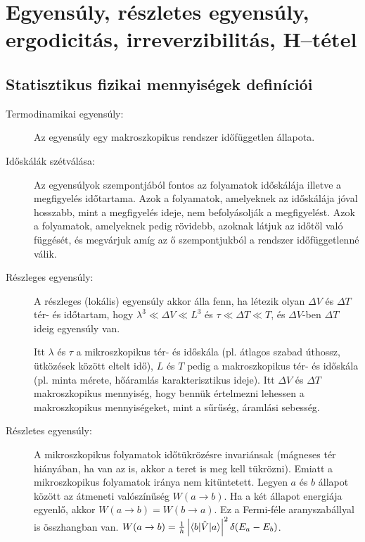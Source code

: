 \chapter{Egyens\'uly, r\'eszletes egyens\'uly, ergodicit\'as, irreverzibilit\'as, H--t\'etel}\label{B1tetel}
 
 \section{Statisztikus fizikai mennyiségek definíciói}
  
  \begin{description}
   \item[Termodinamikai egyensúly:]
    
    Az egyensúly egy makroszkopikus rendszer időfüggetlen állapota. 
   
   \item[Időskálák szétválása:]
    
    Az egyensúlyok szempontjából fontos az folyamatok időskálája illetve a megfigyelés időtartama. Azok a folyamatok, amelyeknek az időskálája jóval hosszabb, mint a megfigyelés ideje, nem befolyásolják a megfigyelést. Azok a folyamatok, amelyeknek pedig rövidebb, azoknak látjuk az időtől való függését, és megvárjuk amíg az ő szempontjukból a rendszer időfüggetlenné válik. 
   
   \item[Részleges egyensúly:]
    
    A részleges (lokális) egyensúly akkor álla fenn, ha létezik olyan $\Delta V$ és $\Delta T$ tér- és időtartam, hogy $\lambda^3\ll\Delta V\ll L^3$ és $\tau\ll \Delta T\ll T$, és $\Delta V$-ben $\Delta T$ ideig egyensúly van. 
    
    Itt $\lambda$ és $\tau$ a mikroszkopikus tér- és időskála (pl. átlagos szabad úthossz, ütközések között eltelt idő), $L$ és $T$ pedig a makroszkopikus tér- és időskála (pl. minta mérete, hőáramlás karakterisztikus ideje). Itt $\Delta V$ és $\Delta T$ makroszkopikus mennyiség, hogy bennük értelmezni lehessen a makroszkopikus mennyiségeket, mint a sűrűség, áramlási sebesség. 
    
   \item[Részletes egyensúly:]
    
    A mikroszkopikus folyamatok időtükrözésre invariánsak (mágneses tér hiányában, ha van az is, akkor a teret is meg kell tükrözni). Emiatt a mikroszkopikus folyamatok iránya nem kitüntetett. Legyen $a$ és $b$ állapot között az átmeneti valószínűség $W(a\to b)$. Ha a két állapot energiája egyenlő, akkor $W(a\to b)=W(b\to a)$. Ez a Fermi-féle aranyszabállyal is összhangban van. $W(a\to b)=\frac{1}{h}\left\lvert\langle b\rvert\hat{V}\lvert a\rangle\right\rvert^2\delta(E_a-E_b)$.
    

\end{description}
